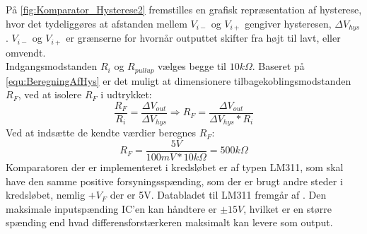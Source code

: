 \noindent
%
På \autoref{fig:Komparator_Hysterese2} fremstilles en grafisk repræsentation af hysterese, hvor det tydeliggøres at afstanden mellem $V_{i-}$ og $V_{i+}$ gengiver hysteresen, $\Delta V_{hys}$. $V_{i-}$ og $V_{i+}$ er grænserne for hvornår outputtet skifter fra højt til lavt, eller omvendt. \\[5mm] 
%
Indgangsmodstanden $R_i$ og $R_{pullup}$ vælges begge til $10k\Omega$. Baseret på \autoref{equ:BeregningAfHys} er det muligt at dimensionere tilbagekoblingsmodstanden $R_F$, ved at isolere $R_F$ i udtrykket:
%
\begin{equation}
 \frac{R_F}{R_i} = \frac{\Delta V_{out}}{\Delta V_{hys}} \Rightarrow R_F = \frac{\Delta V_{out}}{\Delta V_{hys}*R_i}
\end{equation}
%
Ved at indsætte de kendte værdier beregnes $R_F$:
%
\begin{equation}
  R_F = \frac{5V}{100mV*10k\Omega} = 500k\Omega
\end{equation}
%
Komparatoren der er implementeret i kredsløbet er af typen LM311, som skal have den samme positive forsyningsspænding, som der er brugt andre steder i kredsløbet, nemlig $+V_F$ der er 5V. Databladet til LM311 fremgår af \textcite{PDF:Komparator}. Den maksimale inputspænding IC'en kan håndtere er $\pm 15V$, hvilket er en større spænding end hvad differensforstærkeren maksimalt kan levere som output. 







